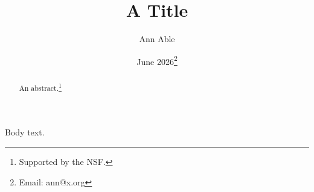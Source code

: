 \documentclass{article}
\title{A Title}
\author{Ann Able}
\date{June 2026\footnote{Email: ann@x.org}}
\begin{document}
\maketitle
\begin{abstract}
An abstract.\thanks{Supported by the NSF.}
\end{abstract}
Body text.
\end{document}

